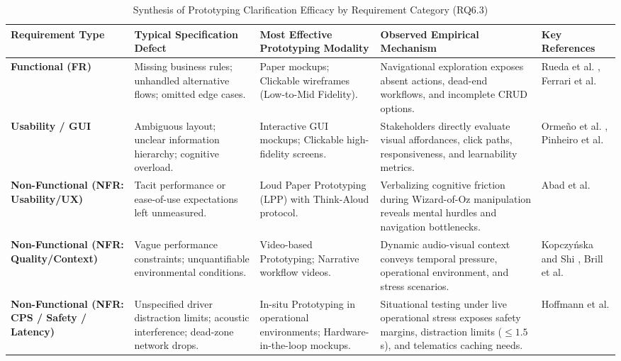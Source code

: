 \begin{table}[t]
\centering
\caption{Synthesis of Prototyping Clarification Efficacy by Requirement Category (RQ6.3)}
\label{tab:req_typology}
\begin{tabularx}{\textwidth}{>{\hsize=0.75\hsize\raggedright\arraybackslash}X >{\hsize=0.95\hsize\raggedright\arraybackslash}X >{\hsize=0.95\hsize\raggedright\arraybackslash}X >{\hsize=1.55\hsize\raggedright\arraybackslash}X >{\hsize=0.80\hsize\raggedright\arraybackslash}X}
\toprule
\textbf{Requirement Type} & \textbf{Typical Specification Defect} & \textbf{Most Effective Prototyping Modality} & \textbf{Observed Empirical Mechanism} & \textbf{Key References} \\
\midrule
\textbf{Functional (FR)} & Missing business rules; unhandled alternative flows; omitted edge cases. & Paper mockups; Clickable wireframes (Low-to-Mid Fidelity). & Navigational exploration exposes absent actions, dead-end workflows, and incomplete CRUD options. & Rueda et al. \cite{rueda2020requirements}, Ferrari et al. \cite{rej2022evolve} \\
\addlinespace
\textbf{Usability / GUI} & Ambiguous layout; unclear information hierarchy; cognitive overload. & Interactive GUI mockups; Clickable high-fidelity screens. & Stakeholders directly evaluate visual affordances, click paths, responsiveness, and learnability metrics. & Orme{\~n}o et al. \cite{uv2023empirical}, Pinheiro et al. \cite{jserd2019protopersona} \\
\addlinespace
\textbf{Non-Functional (NFR: Usability/UX)} & Tacit performance or ease-of-use expectations left unmeasured. & Loud Paper Prototyping (LPP) with Think-Aloud protocol. & Verbalizing cognitive friction during Wizard-of-Oz manipulation reveals mental hurdles and navigation bottlenecks. & Abad et al. \cite{abad2018loud} \\
\addlinespace
\textbf{Non-Functional (NFR: Quality/Context)} & Vague performance constraints; unquantifiable environmental conditions. & Video-based Prototyping; Narrative workflow videos. & Dynamic audio-visual context conveys temporal pressure, operational environment, and stress scenarios. & Kopczy{\'n}ska and Shi \cite{bano2023videos}, Brill et al. \cite{brill2010videos} \\
\addlinespace
\textbf{Non-Functional (NFR: CPS / Safety / Latency)} & Unspecified driver distraction limits; acoustic interference; dead-zone network drops. & In-situ Prototyping in operational environments; Hardware-in-the-loop mockups. & Situational testing under live operational stress exposes safety margins, distraction limits ($\le 1.5$s), and telematics caching needs. & Hoffmann et al. \cite{hoffmann2011automotive} \\
\bottomrule
\end{tabularx}
\end{table}

